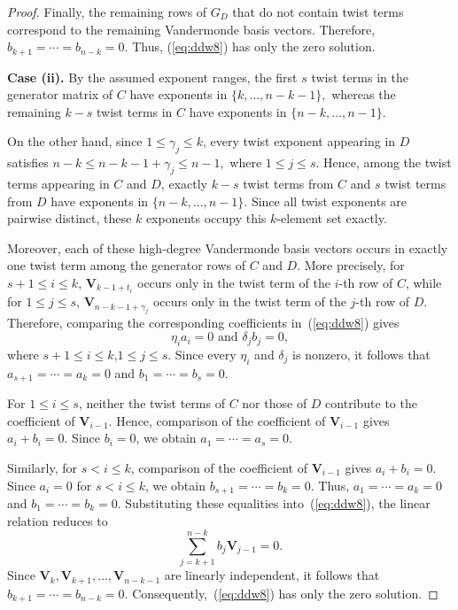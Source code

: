 \documentclass[12pt,draftcls,journal,onecolumn]{IEEEtran}
\begin{document}
\begin{proof}
Finally, the remaining rows of \(G_D\) that do not contain twist terms correspond to the remaining Vandermonde basis vectors. Therefore,
\(
b_{k+1}=\cdots=b_{n-k}=0.
\)
Thus, (\ref{eq:ddw8}) has only the zero solution.

\medskip
\noindent\textbf{Case (ii).}
By the assumed exponent ranges, the first \(s\) twist terms in the
generator matrix of \(C\) have exponents in
\(
\{k,\ldots,n-k-1\},
\)
whereas the remaining \(k-s\) twist terms in \(C\) have exponents in
\(
\{n-k,\ldots,n-1\}.
\)

On the other hand, since \(1\le \gamma_j\le k\), every twist exponent
appearing in \(D\) satisfies
\(
n-k\le n-k-1+\gamma_j\le n-1,
\)
where \(1\le j\le s\).
Hence, among the twist terms appearing in \(C\) and \(D\), exactly
\(k-s\) twist terms from \(C\) and \(s\) twist terms from \(D\) have
exponents in
\(
\{n-k,\ldots,n-1\}.
\)
Since all twist exponents are pairwise distinct, these \(k\) exponents
occupy this \(k\)-element set exactly.

Moreover, each of these high-degree Vandermonde basis vectors occurs
in exactly one twist term among the generator rows of \(C\) and \(D\).
More precisely, for \(s+1\le i\le k\),
\(\mathbf{V}_{k-1+t_i}\) occurs only in the twist term of the
\(i\)-th row of \(C\), while for \(1\le j\le s\),
\(\mathbf{V}_{n-k-1+\gamma_j}\) occurs only in the twist term of the
\(j\)-th row of \(D\). Therefore, comparing the corresponding
coefficients in~(\ref{eq:ddw8}) gives
\[
\eta_i a_i=0\text{ and }\delta_j b_j=0,
\]
where \(s+1\le i\le k\),\(1\le j\le s\).
Since every \(\eta_i\) and \(\delta_j\) is nonzero, it follows that
\(a_{s+1}=\cdots=a_k=0\) and \(b_1=\cdots=b_s=0\).

For \(1\le i\le s\), neither the twist terms of \(C\) nor those of
\(D\) contribute to the coefficient of \(\mathbf{V}_{i-1}\).
Hence, comparison of the coefficient of \(\mathbf{V}_{i-1}\) gives
\(
a_i+b_i=0.
\)
Since \(b_i=0\), we obtain
\(
a_1=\cdots=a_s=0.
\)

Similarly, for \(s<i\le k\), comparison of the coefficient of
\(\mathbf{V}_{i-1}\) gives
\(
a_i+b_i=0.
\)
Since \(a_i=0\) for \(s<i\le k\), we obtain
\(
b_{s+1}=\cdots=b_k=0.
\)
Thus,
\(a_1=\cdots=a_k=0\) and \(b_1=\cdots=b_k=0\).
Substituting these equalities into~(\ref{eq:ddw8}), the linear relation
reduces to
\[
\sum_{j=k+1}^{n-k} b_j\mathbf{V}_{j-1}=0.
\]
Since
\(
\mathbf{V}_k,\mathbf{V}_{k+1},\ldots,
\mathbf{V}_{n-k-1}
\)
are linearly independent, it follows that
\(
b_{k+1}=\cdots=b_{n-k}=0.
\)
Consequently,~(\ref{eq:ddw8}) has only the zero solution.


\end{proof}
\end{document}
